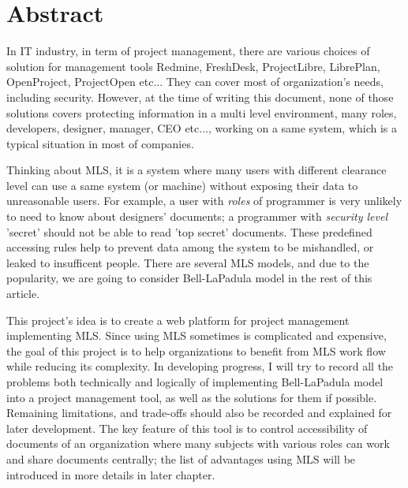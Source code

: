 

\begingroup
\let\clearpage\relax
\let\cleardoublepage\relax
\let\cleardoublepage\relax

\chapter*{Abstract} %

In IT industry, in term of project management, there are various choices of solution for management tools \eg Redmine, FreshDesk, ProjectLibre, LibrePlan, OpenProject, ProjectOpen etc...
They can cover most of organization's needs, including security.
However, at the time of writing this document, none of those solutions covers protecting information in a multi level environment, \ie many roles, \eg developers, designer, manager, CEO etc..., working on a same system, which is a typical situation in most of companies. 

Thinking about MLS, it is a system where many users with different clearance level can use a same system (or machine) without exposing their data to unreasonable users.
For example, a user with \emph{roles} of programmer is very unlikely to need to know about designers' documents;
a programmer with \emph{security level} 'secret' should not be able to read 'top secret' documents.
These predefined accessing rules help to prevent data among the system to be mishandled, or leaked to insufficent people.
There are several MLS models, and due to the popularity, we are going to consider Bell-LaPadula model in the rest of this article.

This project's idea is to create a web platform for project management implementing MLS.
Since using MLS sometimes is complicated and expensive, the goal of this project is to help organizations to benefit from MLS work flow while reducing its complexity.
In developing progress, I will try to record all the problems both technically and logically of implementing Bell-LaPadula model into a project management tool, as well as the solutions for them if possible.
Remaining limitations, and trade-offs should also be recorded and explained for later development.
The key feature of this tool is to control accessibility of documents of an organization where many subjects with various roles can work and share documents centrally; the list of advantages using MLS will be introduced in more details in later chapter.

 \endgroup			

\vfill
